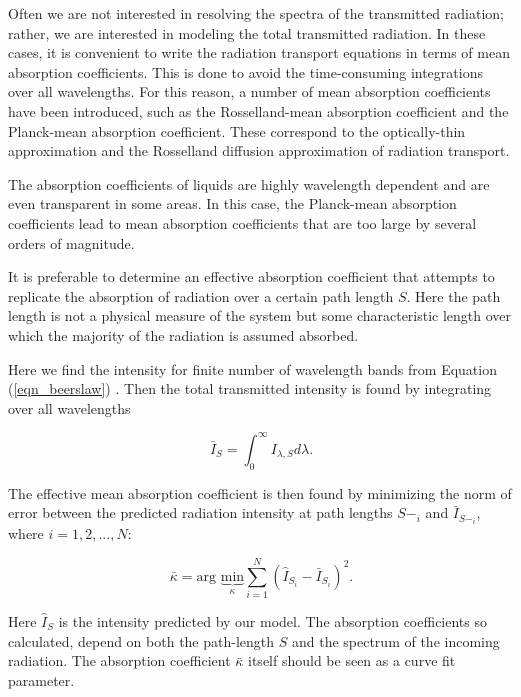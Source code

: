 Often we are not interested in resolving the spectra of the transmitted radiation; rather, we are interested in modeling the total transmitted radiation. In these cases, it is convenient to write the radiation transport equations in terms of mean absorption coefficients. This is done to avoid the time-consuming integrations over all wavelengths. For this reason, a number of mean absorption coefficients have been introduced, such as the Rosselland-mean absorption coefficient and the Planck-mean absorption coefficient. These correspond to the optically-thin approximation and the Rosselland diffusion approximation of radiation transport.

The absorption coefficients of liquids are highly wavelength dependent and are even transparent in some areas. In this case, the Planck-mean absorption coefficients lead to mean absorption coefficients that are too large by several orders of magnitude. 

It is preferable to determine an effective absorption coefficient that attempts to replicate the absorption of radiation over a certain path length $S$. Here the path length is not a physical measure of the system but some characteristic length over which the majority of the radiation is assumed absorbed.

Here we find the intensity for finite number of wavelength bands from Equation (\ref{eqn_beerslaw}) . Then the total transmitted intensity is found by integrating over all wavelengths

\begin{equation}
\label{eqn_totintens}
     \ \bar{I}_S = \int_{0}^{\infty} I_{\lambda,S} d\lambda \mbox{.}
\end{equation}

The effective mean absorption coefficient is then found by minimizing the norm of error between the predicted radiation intensity at path lengths $S-_i$ and $\bar{I}_{S-_i}$, where $i=1,2,...,N$:

\begin{equation}
\label{eqn_effcoeff}
     \ \bar{\kappa} = \mbox{arg } \underbrace{\mbox{min}}_{\kappa} \sum_{i=1}^{N} \left(\hat{I}_{S_i}-\bar{I}_{S_i}\right)^{2}  \mbox{.}
\end{equation}

Here $\hat{I}_S$ is the intensity predicted by our model.  The absorption coefficients so calculated, depend on both the path-length $S$ and the spectrum of the incoming radiation. The absorption coefficient $\bar{\kappa}$ itself should be seen as a curve fit parameter.

